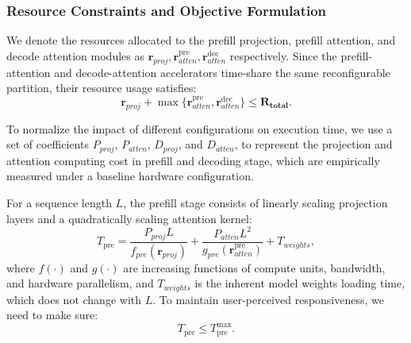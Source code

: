\documentclass[9pt,sigconf]{acmart}
\begin{document}
\subsubsection{Resource Constraints and Objective Formulation}



We denote the resources allocated to the prefill projection, prefill attention, and decode attention modules as $\mathbf{r}_{proj}, \mathbf{r}_{atten}^{\text{pre}},  \mathbf{r}_{atten}^{\text{dec}}$
respectively. Since the prefill-attention and decode-attention accelerators time-share the same reconfigurable partition, their resource usage satisfies:
\begin{equation}
\mathbf{r}_{proj} + \max\{\mathbf{r}_{atten}^{\text{pre}}, \mathbf{r}_{atten}^{\text{dec}}\} \le \mathbf{R_{total}}.
\label{eq:resource_constraint}
\end{equation}

To normalize the impact of different configurations on execution time, we use a set of coefficients $P_{proj}$, $P_{atten}$, $D_{proj}$, and $D_{atten}$, to represent the projection and attention computing cost in prefill and decoding stage, which are empirically measured under a baseline hardware configuration.


For a sequence length $L$, the prefill stage consists of linearly scaling projection layers and a quadratically scaling attention kernel:
\begin{equation}
T_{\text{pre}} 
= \frac{P_{proj} L}{f_{pre}(\mathbf{r}_{proj})} 
+ \frac{P_{atten} L^{2}}{g_{pre}(\mathbf{r}_{atten}^{\text{pre}})}
+ T_{weights},
\label{eq:prefill_latency}
\end{equation}
where $f(\cdot)$ and $g(\cdot)$ are increasing functions of compute units, bandwidth, and hardware parallelism, and $T_{weights}$ is the inherent model weights loading time, which does not change with $L$. To maintain user-perceived responsiveness, we need to make sure:
\begin{equation}
T_{\text{pre}} \le T_{\text{pre}}^{\max}.
\label{eq:prefill_bound}
\end{equation}
\end{document}
